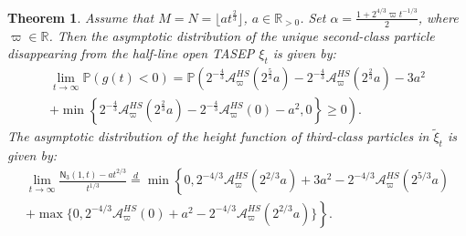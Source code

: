 \documentclass[12pt,a4paper]{amsart}
\newtheorem{theorem}{Theorem} %
\theoremstyle{remark}
\numberwithin{equation}{section} \numberwithin{theorem}{section}
\begin{document}
\begin{theorem}
\label{thm:two-shocks-KPZ-5}
Assume that $M=N=\lfloor at^{\frac23} \rfloor$, $a\in \mathbb{R}_{>0}$. Set $\alpha = \frac{1+2^{4/3}\varpi t^{-1/3}}{2}$, where $\varpi \in \mathbb{R}$. Then the asymptotic distribution of the unique second-class particle disappearing from the half-line open TASEP $\xi_t$ is given by:
\begin{multline}
\label{eq:two-shocks-disappear}
\lim_{t \to \infty}\mathbb{P}(g(t)<0)  = \mathbb{P}\left(2^{-\frac{4}{3}}\mathcal{A}_{\varpi}^{HS}(2^{\frac53}a)-2^{-\frac{4}{3}}\mathcal{A}_{\varpi}^{HS}(2^{\frac23}a) - 3a^2\right.\\
\left. + \min\left\{2^{-\frac{4}{3}}\mathcal{A}_{\varpi}^{HS}(2^{\frac23}a)-2^{-\frac{4}{3}}\mathcal{A}_{\varpi}^{HS}(0) - a^2,0 \right\} \geq 0\right).
\end{multline}
The asymptotic distribution of the height function of third-class particles in $\tilde{\xi}_t$ is given by:
\begin{multline}
\label{eq:two-shocks-kpz}
\lim_{t\to\infty}\frac{\mathsf{N}_{3} (1,t)-at^{2/3}}{t^{1/3}} \stackrel{d}{=} \min \left\{0, 2^{-4/3}\mathcal{A}_{\varpi}^{HS}(2^{2/3}a)+3a^2 - 2^{-4/3}\mathcal{A}_{\varpi}^{HS}(2^{5/3}a) \right.\\
\left. +\max\{0, 2^{-4/3}\mathcal{A}_{\varpi}^{HS}(0)+a^2 - 2^{-4/3}\mathcal{A}_{\varpi}^{HS}(2^{2/3}a)\}\right\}.
\end{multline}
\end{theorem}
\end{document}
